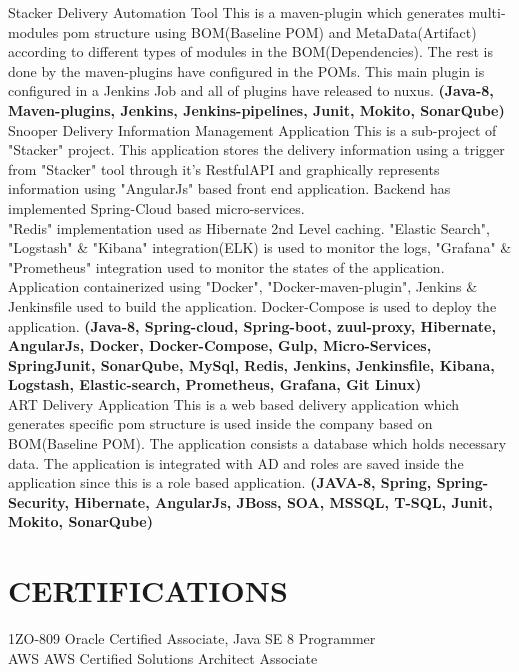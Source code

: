 \documentclass[]{cv-class}
\begin{document}
\newpage
\begin{aside}
\end{aside}


\begin{entrylist}
    \entry
    {}
	{Stacker}
    {Delivery Automation Tool}
	{This is a maven-plugin which generates multi-modules pom structure using BOM(Baseline POM) and MetaData(Artifact) according to different types of 			modules in the BOM(Dependencies). The rest is done by the maven-plugins have configured in the POMs. This main plugin is configured in a Jenkins Job 		and all of plugins have released to nuxus. \textbf{(Java-8, Maven-plugins, Jenkins, Jenkins-pipelines, Junit, Mokito, SonarQube)}}
	\entry
    {}
	{Snooper}
    {Delivery Information Management Application}
	{This is a sub-project of "Stacker" project. This application stores the delivery information using a trigger from "Stacker" tool through it's RestfulAPI and graphically represents information using "AngularJs" based front end application. Backend has implemented Spring-Cloud based micro-services. \\"Redis" implementation used as Hibernate 2nd Level caching. "Elastic Search", "Logstash" \& "Kibana" integration(ELK) is used to monitor the logs, "Grafana" \& "Prometheus" integration used to monitor the states of the application. Application containerized using "Docker", "Docker-maven-plugin", Jenkins \& Jenkinsfile used to build the application. Docker-Compose is used to deploy the application. \textbf{(Java-8, Spring-cloud, Spring-boot, zuul-proxy, Hibernate, AngularJs, Docker, Docker-Compose, Gulp, Micro-Services, SpringJunit, SonarQube, MySql, Redis, Jenkins, Jenkinsfile, Kibana, Logstash, Elastic-search, Prometheus, Grafana, Git  Linux)}}
	\\
    \entry
    {}
	{ART}    
    {Delivery Application}
    {This is a web based delivery application which generates specific pom structure is used inside the company based on BOM(Baseline POM). The application consists a database which holds necessary data. The application is integrated with AD and roles are saved inside the application since this is a role based application. \textbf{(JAVA-8, Spring, Spring-Security, Hibernate, AngularJs, JBoss, SOA, MSSQL, T-SQL, Junit, Mokito, SonarQube)}}
    \\
\end{entrylist}


\section{CERTIFICATIONS}
\begin{entrylist}
\entry
    {}
	{1ZO-809}
    {}
	{Oracle Certified Associate, Java SE 8 Programmer}
\\
\entry
    {}
	{AWS}
    {}
	{AWS Certified Solutions Architect Associate}
\end{entrylist}
\end{document}
